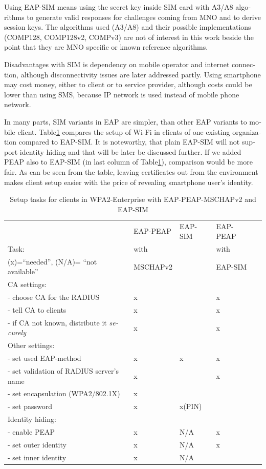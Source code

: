 \documentclass[12pt,a4paper,english]{tutthesis}
\begin{document}
\begin{otherlanguage}{english}
  Using EAP-SIM means using the secret key inside SIM card with A3/A8
algorithms to generate valid responses for challenges coming from MNO
and to derive session keys.  The algorithms used (A3/A8) and their
possible implementations (COMP128, COMP128v2, COMPv3) are not of
interest in this work beside the point that they are MNO specific or known reference algorithms.


Disadvantages with SIM is dependency on mobile operator and internet
connection, although disconnectivity issues are later addressed partly.
Using smartphone may cost money, either to client or to service
provider, although costs could be lower than using SMS, because 
IP network is used instead of mobile phone network.

In many parts, SIM variants in EAP are simpler, than other EAP
variants to mobile client.  Table\ref{table-peapsim} compares the setup of Wi-Fi
in clients of one existing organization compared to EAP-SIM. It
is noteworthy, that plain EAP-SIM will not support identity hiding and
that will be later be discussed further. If we added PEAP
also to EAP-SIM (in last column of Table\ref{table-peapsim}), comparison would be more fair.
As can be seen from the table, leaving certificates out from the environment
makes client setup easier with the price of revealing smartphone user's
identity.  







\begin{table}[htb]
\caption{\label{table-peapsim}Setup tasks for clients in WPA2-Enterprise with EAP-PEAP-MSCHAPv2 and EAP-SIM}
\centering
\begin{tabular}{|l|l|l|ll|}
\hline
 & EAP-PEAP & EAP-SIM & EAP-PEAP & \\
Task: & with &  & with & \\
(x)=``needed'', (N/A)= ``not available'' & MSCHAPv2 &  & EAP-SIM & \\
\hline
CA settings: &  &  &  & \\
- choose CA for the RADIUS & x &  & x & \\
- tell CA to clients & x &  & x & \\
- if CA not known, distribute it \emph{securely} & x &  & x & \\
\hline
Other settings: &  &  &  & \\
- set used EAP-method & x & x & x & \\
- set validation of RADIUS server's name & x &  & x & \\
- set encapsulation (WPA2/802.1X) & x &  &  & \\
- set password & x & x(PIN) &  & \\
\hline
Identity hiding: &  &  &  & \\
- enable PEAP & x & N/A & x & \\
- set outer identity & x & N/A & x & \\
- set inner identity & x & N/A &  & \\
\hline
\end{tabular}
\end{table}



\end{otherlanguage}
\end{document}
